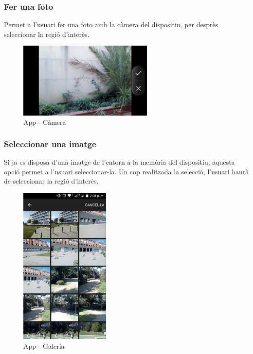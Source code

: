 	\subsubsection{Fer una foto}
		Permet a l'usuari fer una foto amb la càmera del dispositiu, per desprès seleccionar la regió d'interès.\\
		\begin{figure}[H]
			\centering
			\includegraphics[width=0.6\textwidth]{images/cam}
			\caption{App - Càmera}
		\end{figure}
	\subsubsection{Seleccionar una imatge}
	Si ja es disposa d'una imatge de l'entorn a la memòria del dispositiu, aquesta opció permet a l'usuari seleccionar-la. Un cop realitzada la selecció, l'usuari haurà de seleccionar la regió d'interès.
		\begin{figure}[H]
			\centering
			\includegraphics[width=0.4\textwidth]{images/gallery}
			\caption{App - Galeria}
		\end{figure}
